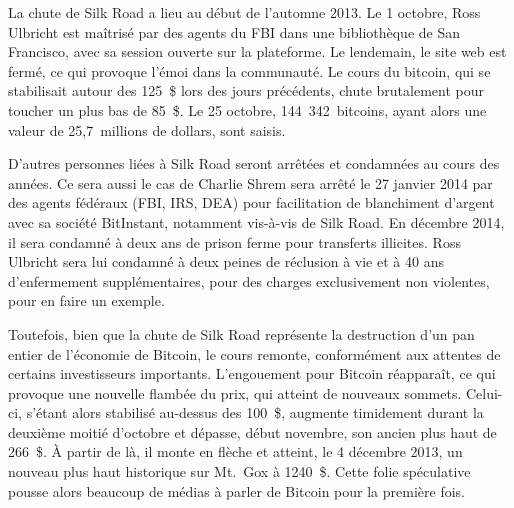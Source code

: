 La chute de Silk Road a lieu au début de l'automne 2013. Le 1\ier{} octobre, Ross Ulbricht est maîtrisé par des agents du FBI dans une bibliothèque de San Francisco, avec sa session ouverte sur la plateforme. Le lendemain, le site web est fermé, ce qui provoque l'émoi dans la communauté. Le cours du bitcoin, qui se stabilisait autour des 125~\$ lors des jours précédents, chute brutalement pour toucher un plus bas de 85~\$. Le 25 octobre, 144~342~bitcoins, ayant alors une valeur de 25,7~millions de dollars, sont saisis.

D'autres personnes liées à Silk Road seront arrêtées et condamnées au cours des années. Ce sera aussi le cas de Charlie Shrem sera arrêté le 27 janvier 2014 par des agents fédéraux (FBI, IRS, DEA) pour facilitation de blanchiment d'argent avec sa société BitInstant, notamment vis-à-vis de Silk Road. En décembre 2014, il sera condamné à deux ans de prison ferme pour transferts illicites. Ross Ulbricht sera lui condamné à deux peines de réclusion à vie et à 40 ans d'enfermement supplémentaires, pour des charges exclusivement non violentes, pour en faire un exemple.

Toutefois, bien que la chute de Silk Road représente la destruction d'un pan entier de l'économie de Bitcoin, le cours remonte, conformément aux attentes de certains investisseurs importants. L'engouement pour Bitcoin réapparaît, ce qui provoque une nouvelle flambée du prix, qui atteint de nouveaux sommets. Celui-ci, s'étant alors stabilisé au-dessus des 100~\$, augmente timidement durant la deuxième moitié d'octobre et dépasse, début novembre, son ancien plus haut de 266~\$. À partir de là, il monte en flèche et atteint, le 4 décembre 2013, un nouveau plus haut historique sur Mt.~Gox à 1240~\$. Cette folie spéculative pousse alors beaucoup de médias à parler de Bitcoin pour la première fois.

